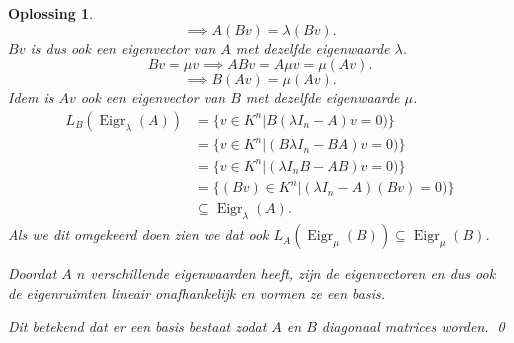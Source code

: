 \documentclass[a4paper,12pt]{article}
\newtheorem{oplossing}{Oplossing}
\begin{document}
\begin{enumerate}
\begin{itemize}
\begin{oplossing}
        \[\implies A(Bv) = \lambda(Bv).\]
        \(Bv\) is dus ook een eigenvector van \(A\) met dezelfde eigenwaarde \(\lambda\).
        \[B v = \mu v \implies ABv = A\mu v = \mu (Av). \]
        \[\implies B(Av) = \mu(Av).\]
        Idem is \(Av\) ook een eigenvector van \(B\) met dezelfde eigenwaarde \(\mu\).
        \begin{align*}
            L_B (\operatorname{Eigr}_\lambda (A)) 
            &= \{ v\in K^n | B(\lambda I_n - A)v = 0)\} \\
            &= \{ v\in K^n | (B\lambda I_n - BA)v = 0)\} \\
            &=\{ v\in K^n | (\lambda I_n B - A B)v = 0)\} \\
            &= \{ (Bv)\in K^n | (\lambda I_n - A)(Bv) = 0)\}\\
            &\subseteq \operatorname{Eigr}_\lambda (A).
        \end{align*}
        Als we dit omgekeerd doen zien we dat ook \(L_A (\operatorname{Eigr}_\mu (B))\subseteq \operatorname{Eigr}_\mu (B)\).

        Doordat \(A\) \(n\) verschillende eigenwaarden heeft, zijn de eigenvectoren en dus ook de eigenruimten lineair onafhankelijk en vormen ze een basis.
        
        Dit betekend dat er een basis bestaat zodat \(A\) en \(B\) diagonaal matrices worden. 
        \qed
    \end{oplossing}
\end{itemize}

\vspace{0.5cm}


\end{enumerate}
\end{document}
